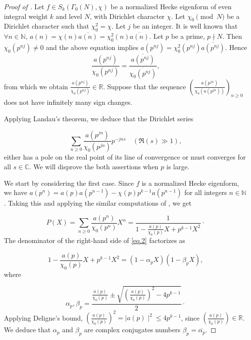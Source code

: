 \documentclass[smallcondensed]{svjour3}
\begin{document}
\begin{proof}[Proof of ]
Let $f\in S_k(\Gamma_{0}(N),\chi)$ be a normalized Hecke eigenform of even integral weight $k$ and level $N$, with Dirichlet character $\chi$. Let $\chi_{0}\pmod N$  be a Dirichlet character such that $\chi_{0}^{2}=\chi$. Let $j$ be an integer. It is well known that $\forall n\in\mathbb{N}$, $a(n)=\chi(n)\overline{a(n)}=\chi_{0}^{2}(n)\overline{a(n)}$. Let $p$ be a prime, $ p\nmid N$. Then $\chi_{0}(p^{nj})\neq 0$ and the above equation implies $a(p^{nj})=\chi_{0}^{2}(p^{nj})\overline{a(p^{nj})}$. Hence 
$$
\frac{a(p^{nj})}{\chi_{0}(p^{nj})}=\frac{\overline{a(p^{nj})}}{\overline{\chi_{0}(p^{nj})}},
$$ 
from which we obtain $\frac{a(p^{nj})}{\chi_{0}(p^{nj})}\in\mathbb{R}$. Suppose that the sequence $\left(\frac{a(p^{jn})}{\chi_{0}(a(p^{jn}))}\right)_{n\geq 0}$ does not have infinitely many sign
changes.

Applying Landau's theorem, we deduce that the Dirichlet series

\begin{equation}
\sum_{n\ge0}\frac{a(p^{jn})}{\chi_{0}(p^{jn})}p^{-jns}\quad (\Re(s)\gg 1),\label{eq:2}
\end{equation}
either has a pole on the real point of its line of convergence or must converges for all $s\in{\mathbb C}$. We will disprove the both assertions when $p$ is large. 

We start by considering the first case. Since $f$ is a normalized Hecke eigenform, we have $a(p^{n})=a(p)a(p^{n-1})-\chi(p)p^{k-1}a(p^{n-1})$ for all integers $n\in\mathbb{N}$. Taking this and applying the similar computations of , we get 

\begin{equation}
P(X)=\sum_{n\ge0}\frac{a(p^n)}{\chi_{0}(p^{n})}X^n=\dfrac{1}{1-\frac{a(p)}{\chi_{0}(p)}X+p^{k-1}X^2}\cdot\label{eq.2}
\end{equation} 
The denominator of the right-hand side of \eqref{eq.2} factorizes as

\begin{equation}
1-\frac{a(p)}{\chi_{0}(p)}X+p^{k-1}X^2=(1-\alpha_pX)(1-\beta_pX),\label{eq:4}
\end{equation}
where

\begin{equation}
\alpha_{p},\beta_{p}=\frac{\frac{a(p)}{\chi_{0}(p)}\pm \sqrt{\left(\frac{a(p)}{\chi_{0}(p)}\right)^{2}-4p^{k-1}}}{2}\cdot\label{eq:08}
\end{equation}
Applying Deligne's bound, $\left(\frac{a(p)}{\chi_{0}(p)}\right)^{2}=\mid a(p)\mid ^{2}\leq 4p^{k-1}$, since $\left(\frac{a(p)}{\chi_{0}(p)}\right)\in\mathbb{R}$. We deduce that $\alpha_p$ and $\beta_p$ are complex conjugates numbers $\beta_{p}=\overline{\alpha_{p}}$.


\end{proof}
\end{document}
